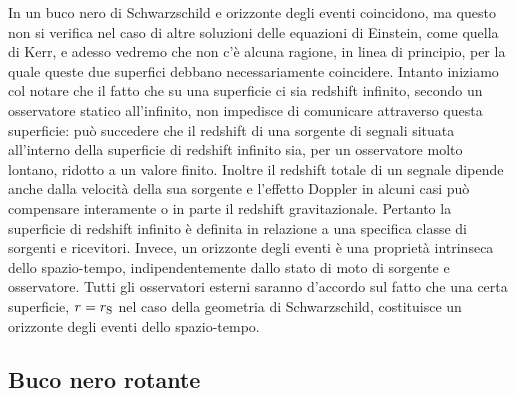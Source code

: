 In un buco nero di Schwarzschild e orizzonte degli eventi coincidono, ma questo
non si verifica nel caso di altre soluzioni delle equazioni di Einstein, come
quella di Kerr, e adesso vedremo che non c'è alcuna ragione, in linea di
principio, per la quale queste due superfici debbano necessariamente coincidere.
Intanto iniziamo col notare che il fatto che su una superficie ci sia redshift
infinito, secondo un osservatore statico all'infinito, non impedisce di
comunicare attraverso questa superficie: può succedere che il redshift di una
sorgente di segnali situata all'interno della superficie di redshift infinito
sia, per un osservatore molto lontano, ridotto a un valore finito.  Inoltre il
redshift totale di un segnale dipende anche dalla velocità della sua sorgente e
l'effetto Doppler in alcuni casi può compensare interamente o in parte il
redshift gravitazionale.  Pertanto la superficie di redshift infinito è definita
in relazione a una specifica classe di sorgenti e ricevitori.  Invece, un
orizzonte degli eventi è una proprietà intrinseca dello spazio-tempo,
indipendentemente dallo stato di moto di sorgente e osservatore.  Tutti gli
osservatori esterni saranno d'accordo sul fatto che una certa superficie, \(r =
r_{\textup{S}}\) nel caso della geometria di Schwarzschild, costituisce un
orizzonte degli eventi dello spazio-tempo.

\subsection{Buco nero rotante}
\label{sec:orizzonte-kerr}

